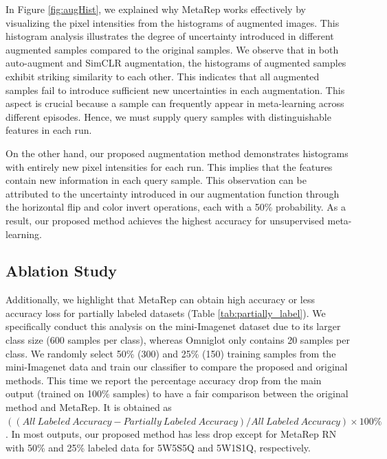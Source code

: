 In Figure \ref{fig:augHist}, we explained why MetaRep works effectively by visualizing the pixel intensities from the histograms of augmented images. This histogram analysis illustrates the degree of uncertainty introduced in different augmented samples compared to the original samples. We observe that in both auto-augment and SimCLR augmentation, the histograms of augmented samples exhibit striking similarity to each other. This indicates that all augmented samples fail to introduce sufficient new uncertainties in each augmentation. This aspect is crucial because a sample can frequently appear in meta-learning across different episodes. Hence, we must supply query samples with distinguishable features in each run. 

On the other hand, our proposed augmentation method demonstrates histograms with entirely new pixel intensities for each run. This implies that the features contain new information in each query sample. This observation can be attributed to the uncertainty introduced in our augmentation function through the horizontal flip and color invert operations, each with a 50\% probability. As a result, our proposed method achieves the highest accuracy for unsupervised meta-learning.

\subsection{Ablation Study}

Additionally, we highlight that MetaRep can obtain high accuracy or less accuracy loss for partially labeled datasets (Table \ref{tab:partially_label}). We specifically conduct this analysis on the mini-Imagenet dataset due to its larger class size (600 samples per class), whereas Omniglot only contains 20 samples per class. We randomly select 50\% (300) and 25\% (150) training samples from the mini-Imagenet data and train our classifier to compare the proposed and original methods. This time we report the percentage accuracy drop from the main output (trained on 100\% samples) to have a fair comparison between the original method and MetaRep. It is obtained as $((All \: Labeled \: Accuracy - Partially \: Labeled \: Accuracy) / All \: Labeled \: Accuracy)\times 100\%$. In most outputs, our proposed method has less drop except for MetaRep RN with 50\% and 25\% labeled data for 5W5S5Q and 5W1S1Q, respectively. 

